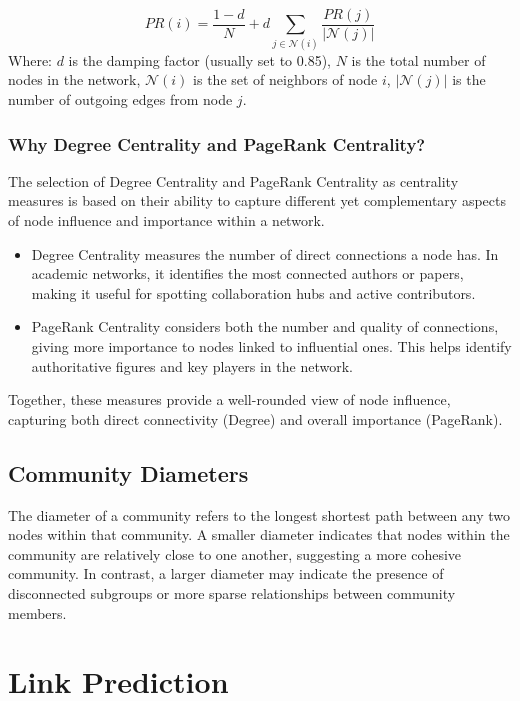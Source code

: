 \documentclass[11pt]{article}
\begin{document}
\[
	PR(i) = \frac{1 - d}{N} + d \sum_{j \in \mathcal{N}(i)} \frac{PR(j)}{|\mathcal{N}(j)|}
\]
Where:
\( d \) is the damping factor (usually set to 0.85),
\( N \) is the total number of nodes in the network,
\( \mathcal{N}(i) \) is the set of neighbors of node \( i \),
\( |\mathcal{N}(j)| \) is the number of outgoing edges from node \( j \).

\subsubsection{Why Degree Centrality and PageRank Centrality?}

The selection of Degree Centrality and PageRank Centrality as centrality measures is based on their ability to capture different yet complementary aspects of node influence and importance within a network.

\begin{itemize}
	\item Degree Centrality measures the number of direct connections a node has. In academic networks, it identifies the most connected authors or papers, making it useful for spotting collaboration hubs and active contributors.
	\item PageRank Centrality considers both the number and quality of connections, giving more importance to nodes linked to influential ones. This helps identify authoritative figures and key players in the network.
\end{itemize}

Together, these measures provide a well-rounded view of node influence, capturing both direct connectivity (Degree) and overall importance (PageRank).


\subsection{Community Diameters}

The diameter of a community refers to the longest shortest path between any two nodes within that community. A smaller diameter indicates that nodes within the community are relatively close to one another, suggesting a more cohesive community. In contrast, a larger diameter may indicate the presence of disconnected subgroups or more sparse relationships between community members.




\section{Link Prediction}
\end{document}
